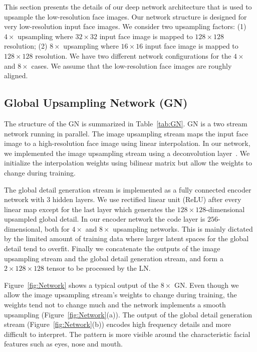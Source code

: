 \documentclass[runningheads]{llncs}
\begin{document}
This section presents the details of our deep network architecture that is used to upsample the low-resolution face images.
Our network structure is designed for very low-resolution input face images. We consider two upsampling factors: (1) $4 \times$ upsampling where  $32 \times 32$ input face image is mapped to $128 \times 128$ resolution; (2) $8 \times$ upsampling where  $16 \times 16$ input face image is mapped to $128 \times 128$ resolution. We have two different network configurations for the $4 \times$ and $8 \times$ cases. We assume that the low-resolution face images are roughly aligned.



\subsection{Global Upsampling Network (GN)}

The structure of the GN is summarized in Table~\ref{tab:GN}. GN is a two stream network running in parallel. The image upsampling stream maps the input face image to a high-resolution face image using linear interpolation. In our network, we implemented the image upsampling stream using a deconvolution layer~\cite{zeiler2010deconvolutional,Long15}. We initialize the interpolation weights using bilinear matrix but allow the weights to change during training.


The global detail generation stream is implemented as a fully connected encoder network with 3 hidden layers. We use rectified linear unit (ReLU) after every linear map except for the last layer which generates the $128 \times 128$-dimensional upsampled global detail. In our encoder network the code layer is $256$-dimensional, both for $4 \times$ and $8 \times$ upsampling networks. This is mainly dictated by the limited amount of training data where larger latent spaces for the global detail tend to overfit. Finally we concatenate the outputs of the image upsampling stream and the global detail generation stream, and form a $2 \times 128 \times 128$ tensor to be processed by the LN.


Figure~\ref{fig:Network} shows a typical output of the $8 \times$ GN. Even though we allow the image upsampling stream's weights to change during training, the weights tend not to change much and the network implements a smooth upsampling (Figure~\ref{fig:Network}(a)). The output of the global detail generation stream (Figure~\ref{fig:Network}(b)) encodes high frequency details and more difficult to interpret. The pattern is more visible around the characteristic facial features such as eyes, nose and mouth.
\end{document}
